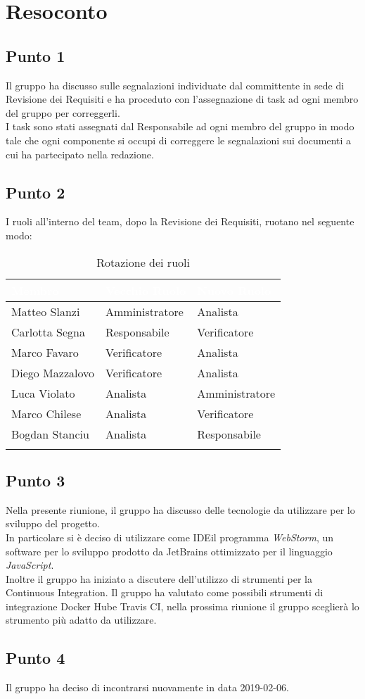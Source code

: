 \section{Resoconto}

\subsection{Punto 1}
Il gruppo ha discusso sulle segnalazioni individuate dal committente in sede di Revisione dei Requisiti e ha proceduto con l'assegnazione di task ad ogni membro del gruppo per correggerli.
\\
I task sono stati assegnati dal Responsabile ad ogni membro del gruppo in modo tale che ogni componente si occupi di correggere le segnalazioni sui documenti a cui ha partecipato nella redazione.

\subsection{Punto 2}
I ruoli all'interno del team, dopo la Revisione dei Requisiti, ruotano nel seguente modo:\\
\begin{center}
\begin{longtable}[c]{|m{}|m{}|m{}|} 
\hline
\rowcolor{bluelogo}\textbf{\textcolor{white}{Membro}} & \textbf{\textcolor{white}{Vecchio Ruolo}} & \textbf{\textcolor{white}{Nuovo Ruolo}}\\
\hline
Matteo Slanzi & Amministratore & Analista\\
\hline
\rowcolor{grigio}Carlotta Segna & Responsabile & Verificatore\\
\hline
Marco Favaro & Verificatore & Analista\\
\hline
\rowcolor{grigio}Diego Mazzalovo & Verificatore & Analista\\
\hline
Luca Violato & Analista & Amministratore\\
\hline
\rowcolor{grigio}Marco Chilese & Analista & Verificatore\\
\hline
Bogdan Stanciu & Analista & Responsabile\\
\hline

\caption{Rotazione dei ruoli}
\end{longtable}
\end{center}

\subsection{Punto 3}
Nella presente riunione, il gruppo ha discusso delle tecnologie da utilizzare per lo sviluppo del progetto. 
\\
In particolare si è deciso di utilizzare come IDE\glossario il programma \textit{WebStorm}, un software per lo sviluppo prodotto da JetBrains ottimizzato per il linguaggio \textit{JavaScript}. 
\\
Inoltre il gruppo ha iniziato a discutere dell'utilizzo di strumenti per la Continuous Integration\glossario. 
Il gruppo ha valutato come possibili strumenti di integrazione Docker Hub\glossario e Travis CI\glossario, nella prossima riunione il gruppo sceglierà lo strumento più adatto da utilizzare.

\subsection{Punto 4}
Il gruppo ha deciso di incontrarsi nuovamente in data 2019-02-06.